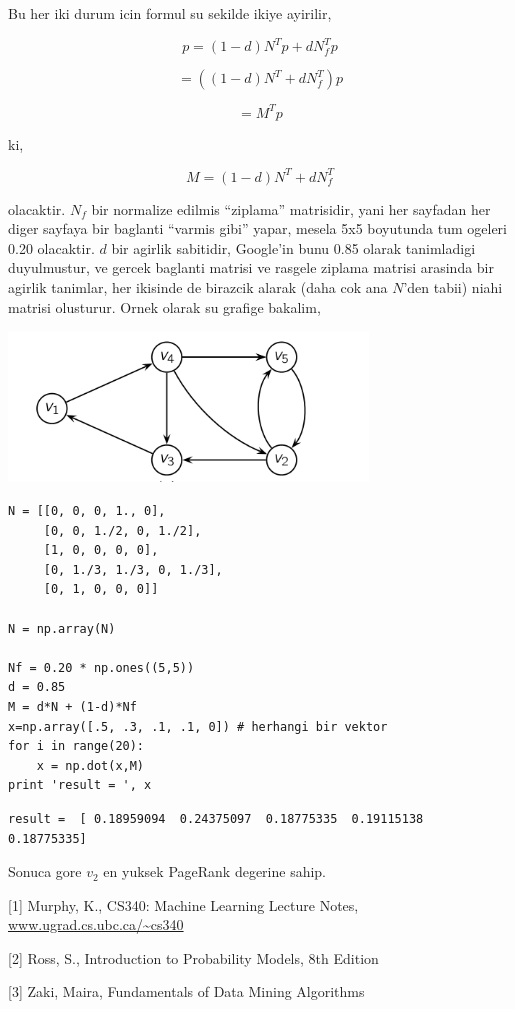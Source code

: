 \documentclass[12pt,fleqn]{article}\usepackage{../common}
\begin{document}
Bu her iki durum icin formul su sekilde ikiye ayirilir,

$$ p = (1-d)N^Tp + dN_f^Tp $$

$$ = ((1-d)N^T + dN_f^T) p $$

$$ = M^Tp $$

ki,

$$M = (1-d)N^T + dN_f^T$$ 

olacaktir. $N_f$ bir normalize edilmis ``ziplama'' matrisidir, yani her
sayfadan her diger sayfaya bir baglanti ``varmis gibi'' yapar, mesela 5x5
boyutunda tum ogeleri 0.20 olacaktir. $d$ bir agirlik sabitidir, Google'in
bunu 0.85 olarak tanimladigi duyulmustur, ve gercek baglanti matrisi ve
rasgele ziplama matrisi arasinda bir agirlik tanimlar, her ikisinde de
birazcik alarak (daha cok ana $N$'den tabii) niahi matrisi olusturur. Ornek
olarak su grafige bakalim, 

\includegraphics[height=4cm]{pg3.png}

\begin{verbatim}
N = [[0, 0, 0, 1., 0],
     [0, 0, 1./2, 0, 1./2],
     [1, 0, 0, 0, 0],
     [0, 1./3, 1./3, 0, 1./3],
     [0, 1, 0, 0, 0]]

N = np.array(N)

Nf = 0.20 * np.ones((5,5))
d = 0.85
M = d*N + (1-d)*Nf
x=np.array([.5, .3, .1, .1, 0]) # herhangi bir vektor
for i in range(20): 
    x = np.dot(x,M)
print 'result = ', x 
\end{verbatim}

\begin{verbatim}
result =  [ 0.18959094  0.24375097  0.18775335  0.19115138  0.18775335]
\end{verbatim}

Sonuca gore $v_2$ en yuksek PageRank degerine sahip. 

[1] Murphy, K., CS340: Machine Learning Lecture Notes, \url{www.ugrad.cs.ubc.ca/~cs340}

[2] Ross, S., Introduction to Probability Models, 8th Edition

[3] Zaki, Maira, Fundamentals of Data Mining Algorithms
\end{document}
